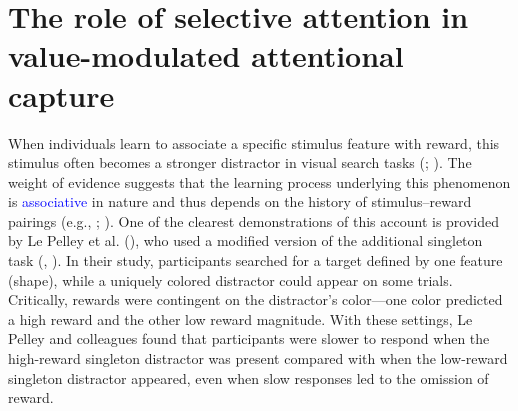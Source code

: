 \documentclass[
  man,
  floatsintext,
  longtable,
  nolmodern,
  notxfonts,
  notimes,
  mask,
  colorlinks=true,linkcolor=blue,citecolor=blue,urlcolor=blue]{apa7}
\begin{document}
\newpage

\section{The role of selective attention in value-modulated attentional
capture}\label{the-role-of-selective-attention-in-value-modulated-attentional-capture}

When individuals learn to associate a specific stimulus feature with
reward, this stimulus often becomes a stronger distractor in visual
search tasks (;
). The weight of
evidence suggests that the learning process underlying this phenomenon
is \textcolor{blue}{associative} in nature and thus depends on the
history of stimulus--reward pairings (e.g.,
;
). One of the clearest
demonstrations of this account is provided by Le Pelley et al.
(), who used a modified version of the
additional singleton task (,
). In their study, participants
searched for a target defined by one feature (shape), while a uniquely
colored distractor could appear on some trials. Critically, rewards were
contingent on the distractor's color---one color predicted a high reward
and the other low reward magnitude. With these settings, Le Pelley and
colleagues found that participants were slower to respond when the
high-reward singleton distractor was present compared with when the
low-reward singleton distractor appeared, even when slow responses led
to the omission of reward.
\end{document}
